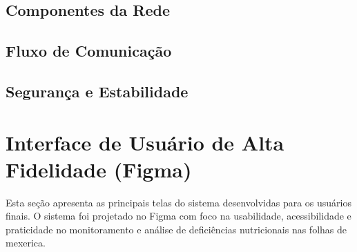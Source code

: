 \documentclass[
    a4paper,
    12pt,
    english,
    brazilian
]{article}
\begin{document}
    \subsection{\textbf{Componentes da Rede}}
    \label{sect:Componentes-da-Rede}
    

    \subsection{\textbf{Fluxo de Comunicação}}
    \label{sect:Fluxo-de-comunicacao}
    

    \subsection{\textbf{Segurança e Estabilidade}}
    \label{sect:Seguranca-e-estabilidade}
    

\section{Interface de Usuário de Alta Fidelidade (Figma)}
\medskip
Esta seção apresenta as principais telas do sistema desenvolvidas para os usuários
finais. O sistema foi projetado no Figma com foco na usabilidade, acessibilidade e praticidade no
monitoramento e análise de deficiências nutricionais nas folhas de mexerica.


\clearpage
\end{document}
